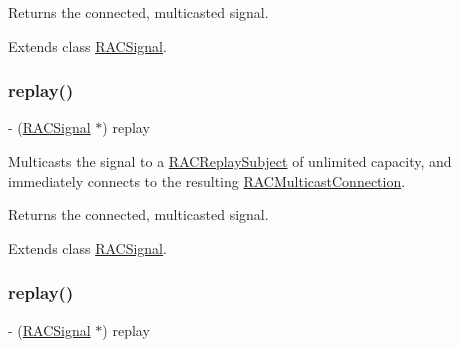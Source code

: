 Returns the connected, multicasted signal. 

Extends class \mbox{\hyperlink{interface_r_a_c_signal_a6d7d83297f6b837dd5efc18c38483a94}{R\+A\+C\+Signal}}.

\mbox{\label{category_r_a_c_signal_07_operations_08_a6d7d83297f6b837dd5efc18c38483a94}} 
\subsubsection{\texorpdfstring{replay()}{replay()}\hspace{0.1cm}{\footnotesize\ttfamily [2/3]}}
{\footnotesize\ttfamily -\/ (\mbox{\hyperlink{interface_r_a_c_signal}{R\+A\+C\+Signal}} $\ast$) replay \begin{DoxyParamCaption}{ }\end{DoxyParamCaption}}

Multicasts the signal to a \mbox{\hyperlink{interface_r_a_c_replay_subject}{R\+A\+C\+Replay\+Subject}} of unlimited capacity, and immediately connects to the resulting \mbox{\hyperlink{interface_r_a_c_multicast_connection}{R\+A\+C\+Multicast\+Connection}}.

Returns the connected, multicasted signal. 

Extends class \mbox{\hyperlink{interface_r_a_c_signal_a6d7d83297f6b837dd5efc18c38483a94}{R\+A\+C\+Signal}}.

\mbox{\label{category_r_a_c_signal_07_operations_08_a6d7d83297f6b837dd5efc18c38483a94}} 
\subsubsection{\texorpdfstring{replay()}{replay()}\hspace{0.1cm}{\footnotesize\ttfamily [3/3]}}
{\footnotesize\ttfamily -\/ (\mbox{\hyperlink{interface_r_a_c_signal}{R\+A\+C\+Signal}} $\ast$) replay \begin{DoxyParamCaption}{ }\end{DoxyParamCaption}}

